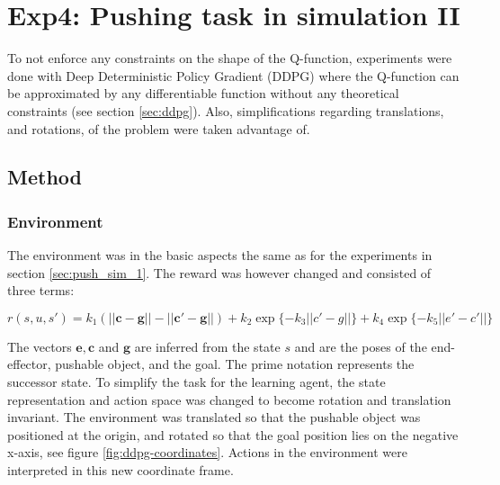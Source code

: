 \chapter{Exp4: Pushing task in simulation II}

To not enforce any constraints on the shape of the Q-function, experiments were
done with Deep Deterministic Policy Gradient (DDPG) where the Q-function can be
approximated by any differentiable function without any theoretical constraints
(see section \ref{sec:ddpg}). Also, simplifications regarding translations, and
rotations, of the problem were taken advantage of.

\section{Method}

\subsection{Environment}

The environment was in the basic aspects the same as for the experiments in
section \ref{sec:push_sim_1}. The reward was however changed and consisted of
three terms:

\begin{equation}
    r(s, u, s') = k_1 \left(\mathbf{||c - g|| - ||c' - g||}\right) + k_2 \exp \lbrace -k_3 ||c' - g|| \rbrace + k_4 \exp \lbrace -k_5||e' - c'||\rbrace
\end{equation}

The vectors $\mathbf{e, c}$ and $\mathbf{g}$ are inferred from the state $s$
and are the poses of the end-effector, pushable object, and the goal. The prime
notation represents the successor state. To simplify the task for the learning
agent, the state representation and action space was changed to become rotation
and translation invariant. The environment was translated so that the pushable
object was positioned at the origin, and rotated so that the goal position lies
on the negative x-axis, see figure \ref{fig:ddpg-coordinates}. Actions in the
environment were interpreted in this new coordinate frame.

